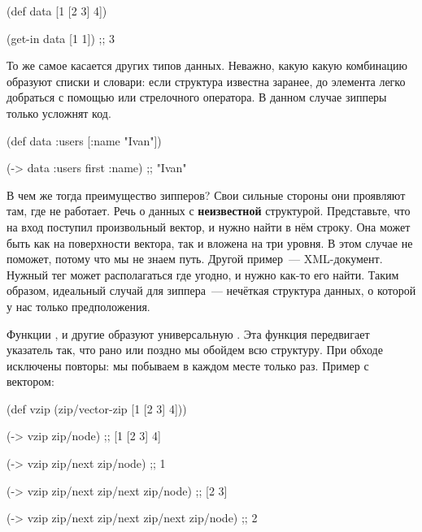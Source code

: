 \begin{english}
  \begin{clojure}
(def data [1 [2 3] 4])

(get-in data [1 1])
;; 3
  \end{clojure}
\end{english}

То же самое касается других типов данных. Неважно, какую какую комбинацию
образуют списки и словари: если структура известна заранее, до элемента легко
добраться с помощью  или стрелочного оператора. В данном случае зипперы
только усложнят код.

\begin{english}
  \begin{clojure}
(def data {:users [{:name "Ivan"}]})

(-> data :users first :name)
;; "Ivan"
  \end{clojure}
\end{english}

В чем же тогда преимущество зипперов? Свои сильные стороны они проявляют там,
где  не работает. Речь о данных с \textbf{неизвестной} структурой. Представьте,
что на вход поступил произвольный вектор, и нужно найти в нём строку. Она может
быть как на поверхности вектора, так и вложена на три уровня. В этом случае
 не поможет, потому что мы не знаем путь. Другой пример~---
XML-документ. Нужный тег может располагаться где угодно, и нужно как-то его
найти. Таким образом, идеальный случай для зиппера~--- нечёткая структура данных,
о которой у нас только предположения.

Функции ,  и другие образуют универсальную . Эта
функция передвигает указатель так, что рано или поздно мы обойдем всю
структуру. При обходе исключены повторы: мы побываем в каждом месте только
раз. Пример с вектором:

\begin{english}
  \begin{clojure}
(def vzip (zip/vector-zip [1 [2 3] 4]))

(-> vzip zip/node)
;; [1 [2 3] 4]

(-> vzip zip/next zip/node)
;; 1

(-> vzip zip/next zip/next zip/node)
;; [2 3]

(-> vzip zip/next zip/next zip/next zip/node)
;; 2
  \end{clojure}
\end{english}

